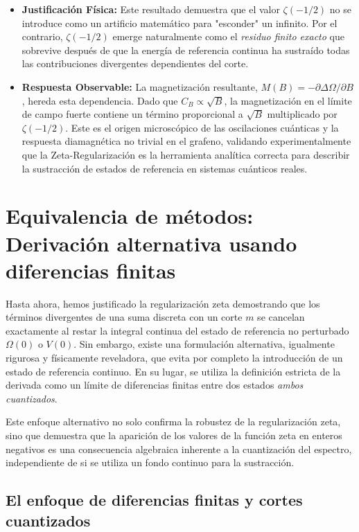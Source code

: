 \begin{itemize}
    \item \textbf{Justificación Física:} Este resultado demuestra que el valor $\zeta(-1/2)$ no se introduce como un artificio matemático para "esconder" un infinito. Por el contrario, $\zeta(-1/2)$ emerge naturalmente como el \textit{residuo finito exacto} que sobrevive después de que la energía de referencia continua ha sustraído todas las contribuciones divergentes dependientes del corte. 
    \item \textbf{Respuesta Observable:} La magnetización resultante, $M(B) = -\partial \Delta\Omega / \partial B$, hereda esta dependencia. Dado que $C_B \propto \sqrt{B}$, la magnetización en el límite de campo fuerte contiene un término proporcional a $\sqrt{B}$ multiplicado por $\zeta(-1/2)$. Este es el origen microscópico de las oscilaciones cuánticas y la respuesta diamagnética no trivial en el grafeno, validando experimentalmente que la Zeta-Regularización es la herramienta analítica correcta para describir la sustracción de estados de referencia en sistemas cuánticos reales.
\end{itemize}


\section{Equivalencia de métodos: Derivación alternativa usando diferencias finitas}

Hasta ahora, hemos justificado la regularización zeta demostrando que los términos divergentes de una suma discreta con un corte $m$ se cancelan exactamente al restar la integral continua del estado de referencia no perturbado $\Omega(0)$ o $V(0)$. Sin embargo, existe una formulación alternativa, igualmente rigurosa y físicamente reveladora, que evita por completo la introducción de un estado de referencia continuo. En su lugar, se utiliza la definición estricta de la derivada como un límite de diferencias finitas entre dos estados \textit{ambos cuantizados}. 

Este enfoque alternativo no solo confirma la robustez de la regularización zeta, sino que demuestra que la aparición de los valores de la función zeta en enteros negativos es una consecuencia algebraica inherente a la cuantización del espectro, independiente de si se utiliza un fondo continuo para la sustracción.

\subsection{El enfoque de diferencias finitas y cortes cuantizados}

